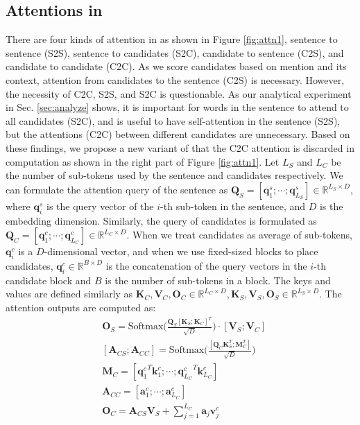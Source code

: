 \subsection{Attentions in \name}
\label{sec:attn}
There are four kinds of attention in {\bf \textsc{\name}} as shown in Figure \ref{fig:attn1}, sentence to sentence (S2S), sentence to candidates (S2C), candidate to sentence (C2S), and candidate to candidate (C2C). As we score candidates based on mention and its context, attention from candidates to the sentence (C2S) is necessary. However, the necessity of C2C, S2S, and S2C is questionable. As our analytical experiment in Sec. \ref{sec:analyze} shows, it is important for words in the sentence to attend to all candidates (S2C), and is useful to have self-attention in the sentence (S2S), but the attentions (C2C) between different candidates are unnecessary. Based on these findings, we propose a new variant of {\bf \textsc{\name}} that the C2C attention is discarded in computation as shown in the right part of Figure \ref{fig:attn1}. Let $L_S$ and $L_C$ be the number of sub-tokens used by the sentence and candidates respectively. We can formulate the attention query of the sentence as $\bm{Q}_S=[\bm{q}^s_{1};\cdots;\bm{q}^s_{L_S}] \in \mathbb{R}^{L_S \times D}$,  where $\bm{q}^s_i$ is the query vector of the $i$-th sub-token in the sentence, and $D$ is the embedding dimension. Similarly, the query of candidates is formulated as $\bm{Q}_C=[\bm{q}^c_{1};\cdots;\bm{q}^c_{L_C}] \in \mathbb{R}^{L_C \times D}$. When we treat candidates as average of sub-tokens, $\bm{q}^c_i$ is a $D$-dimensional vector, and when we use fixed-sized blocks to place candidates, $\bm{q}^c_i \in \mathbb{R}^{B \times D}$ is the concatenation of the query vectors in the $i$-th candidate block and $B$ is the number of sub-tokens in a block. The keys and values are defined similarly as $\bm{K}_C, \bm{V}_C, \bm{O}_C \in \mathbb{R}^{L_C \times D},  \bm{K}_S, \bm{V}_S, \bm{O}_S \in \mathbb{R}^{L_S \times D}$. The attention outputs are computed as:
\begin{align}
& \bm{O}_S  = \text{Softmax} \big( \frac{\bm{Q}_S [\bm{K}_S; \bm{K}_C]^T}{\sqrt{D}} \big) \cdot [\bm{V}_S; \bm{V}_C] \\
&[\bm{A}_{CS}; \bm{A}_{CC}]  = \text{Softmax} \big( \frac{[\bm{Q}_C \bm{K}_S^T; \bm{M}_C^T]}{\sqrt{D}} \big)  \\
&\bm{M}_C  =  [{\bm{q}_1^c}^T \bm{k}_1^c; \cdots; {\bm{q}_{L_C}^c}^T \bm{k}_{L_C}^c] \\
&\bm{A}_{CC} = [\bm{a}^c_{1}; \cdots; \bm{a}^c_{L_C}] \\
&\bm{O}_C = \bm{A}_{CS} \bm{V}_S + \sum_{j=1}^{L_C} \bm{a}_j \bm{v}^c_j
\end{align}
